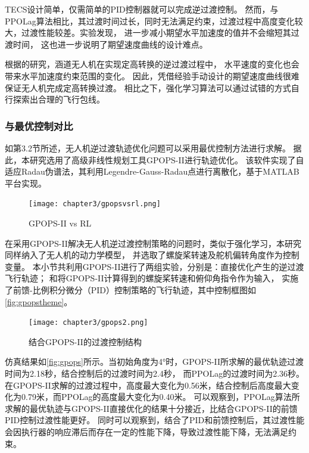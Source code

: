 TECS设计简单，仅需简单的PID控制器就可以完成逆过渡控制。
然而，与PPOLag算法相比，其过渡时间过长，同时无法满足约束，过渡过程中高度变化较大，过渡性能较差。实验发现，
进一步减小期望水平加速度的值并不会缩短其过渡时间，
这也进一步说明了期望速度曲线的设计难点。

根据\cite{cheng2022transition}的研究，涵道无人机在实现定高转换的逆过渡过程中，
水平速度的变化也会带来水平加速度约束范围的变化。
因此，凭借经验手动设计的期望速度曲线很难保证无人机完成定高转换过渡。
相比之下，强化学习算法可以通过试错的方式自行探索出合理的飞行包线。

\subsubsection{与最优控制对比}


如第3.2节所述，无人机逆过渡轨迹优化问题可以采用最优控制方法进行求解。
据此，本研究选用了高级非线性规划工具GPOPS-II\cite{patterson2014gpops}进行轨迹优化。
该软件实现了自适应Radau伪谱法，其利用Legendre-Gauss-Radau点进行离散化，基于MATLAB平台实现。
\begin{figure}[htbp]
    \centering
    \texttt{[image: chapter3/gpopsvsrl.png]}
    \caption{\label{fig:gpops}GPOPS-II vs RL}
    \label{fig:gpops}
\end{figure}

在采用GPOPS-II解决无人机逆过渡控制策略的问题时，类似于强化学习，本研究同样纳入了无人机的动力学模型，
并选取了螺旋桨转速及舵机偏转角度作为控制变量。
本小节共利用GPOPS-II进行了两组实验，分别是：直接优化产生的逆过渡飞行轨迹；
和将GPOPS-II计算得到的螺旋桨转速和俯仰角指令作为输入，
实施了前馈-比例积分微分（PID）控制策略\cite{verling2017model}的飞行轨迹，其中控制框图如\autoref{fig:gpopstheme}。
\begin{figure}[H]
    \centering
    \texttt{[image: chapter3/gpops2.png]}
    \caption{\label{fig:gpopstheme}结合GPOPS-II的过渡控制结构}
    \label{fig:gpops}
\end{figure}

仿真结果如\autoref{fig:gpops}所示。当初始角度为4°时，GPOPS-II所求解的最优轨迹过渡时间为2.18秒，结合控制后的过渡时间为2.4秒，
而PPOLag的过渡时间为2.36秒。在GPOPS-II求解的过渡过程中，高度最大变化为0.56米，结合控制后高度最大变化为0.79米，而PPOLag的高度最大变化为0.40米。
可以观察到，PPOLag算法所求解的最优轨迹与GPOPS-II直接优化的结果十分接近，比结合GPOPS-II的前馈PID控制过渡性能更好。
同时可以观察到，结合了PID和前馈控制后，其过渡性能会因执行器的响应滞后而存在一定的性能下降，导致过渡性能下降，无法满足约束。

